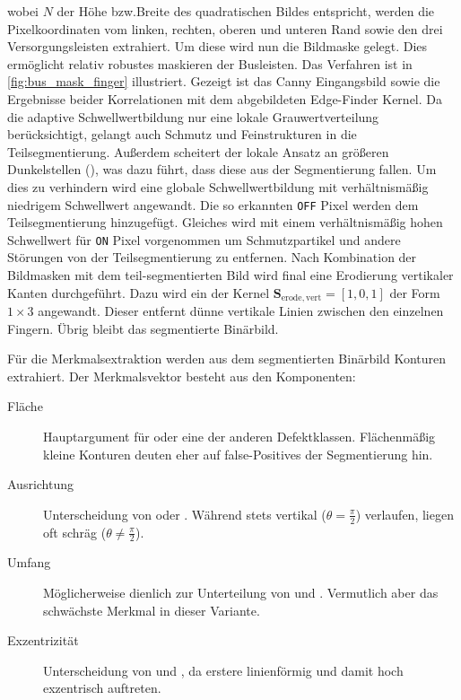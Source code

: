 wobei \(N\) der Höhe bzw.\@ Breite des quadratischen Bildes entspricht, werden die Pixelkoordinaten vom linken, rechten, oberen und unteren Rand sowie den drei Versorgungsleisten extrahiert. Um diese wird nun die Bildmaske gelegt. Dies ermöglicht relativ robustes maskieren der Busleisten. Das Verfahren ist in \cref{fig:bus_mask_finger} illustriert. Gezeigt ist das \foreignlanguage{english}{Canny} Eingangsbild sowie die Ergebnisse beider Korrelationen mit dem abgebildeten \foreignlanguage{english}{Edge-Finder} Kernel. Da die adaptive Schwellwertbildung nur eine lokale Grauwertverteilung berücksichtigt, gelangt auch Schmutz und Feinstrukturen in die Teilsegmentierung. Außerdem scheitert der lokale Ansatz an größeren Dunkelstellen (), was dazu führt, dass diese aus der Segmentierung fallen. Um dies zu verhindern wird eine globale Schwellwertbildung mit verhältnismäßig niedrigem Schwellwert angewandt. Die so erkannten \texttt{\foreignlanguage{english}{OFF}} Pixel werden dem Teilsegmentierung hinzugefügt. Gleiches wird mit einem verhältnismäßig hohen Schwellwert für \texttt{\foreignlanguage{english}{ON}} Pixel vorgenommen um Schmutzpartikel und andere Störungen von der Teilsegmentierung zu entfernen. Nach Kombination der Bildmasken mit dem teil-segmentierten Bild wird final eine Erodierung vertikaler Kanten durchgeführt. Dazu wird ein der Kernel \(\boldsymbol{S}_{\mathrm{erode},\mathrm{vert}} = {\left[ 1, 0, 1 \right]}\) der Form \(1 \times 3\) angewandt. Dieser entfernt dünne vertikale Linien zwischen den einzelnen Fingern. Übrig bleibt das segmentierte Binärbild.

Für die Merkmalsextraktion werden aus dem segmentierten Binärbild Konturen extrahiert. Der Merkmalsvektor besteht aus den Komponenten:
%
\begin{description}
    \item[Fläche] Hauptargument für  oder eine der anderen Defektklassen. Flächenmäßig kleine Konturen deuten eher auf \foreignlanguage{english}{false-Positives} der Segmentierung hin.
    \item[Ausrichtung] Unterscheidung von  oder . Während stets vertikal (\(\theta = \frac{\pi}{2}\)) verlaufen, liegen  oft schräg (\(\theta \neq \frac{\pi}{2}\)).
    \item[Umfang] Möglicherweise dienlich zur Unterteilung von  und . Vermutlich aber das schwächste Merkmal in dieser Variante.
    \item[Exzentrizität] Unterscheidung von  und , da erstere linienförmig und damit hoch exzentrisch auftreten.
\end{description}

